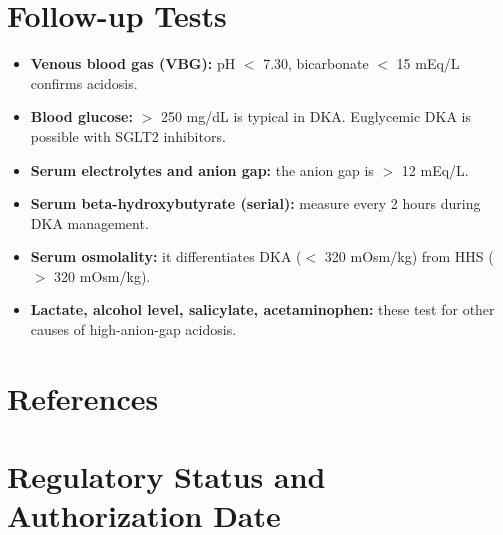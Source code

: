 \section*{Follow-up Tests}
\begin{itemize}
  \item \textbf{Venous blood gas (VBG):} pH $<$ 7.30, bicarbonate $<$ 15 mEq/L confirms acidosis.
  \item \textbf{Blood glucose:} $>$ 250 mg/dL is typical in DKA. Euglycemic DKA is possible with SGLT2 inhibitors.
  \item \textbf{Serum electrolytes and anion gap:} the anion gap is $>$ 12 mEq/L.
  \item \textbf{Serum beta-hydroxybutyrate (serial):} measure every 2 hours during DKA management.
  \item \textbf{Serum osmolality:} it differentiates DKA ($<$ 320 mOsm/kg) from HHS ($>$ 320 mOsm/kg).
  \item \textbf{Lactate, alcohol level, salicylate, acetaminophen:} these test for other causes of high-anion-gap acidosis.
\end{itemize}

\section*{References}



\clearpage
\section*{Regulatory Status and Authorization Date}

\clearpage
